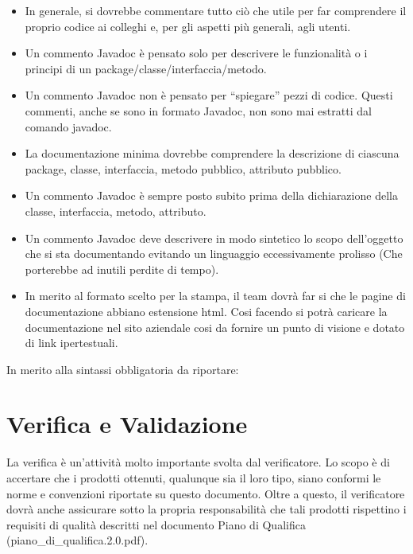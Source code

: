 {\begin{itemize}
	\item In generale, si dovrebbe commentare tutto ciò che utile per far comprendere il proprio codice ai colleghi e, per gli aspetti più generali, agli utenti.
	\item Un commento Javadoc è pensato solo per descrivere le funzionalità o i principi di un package/classe/interfaccia/metodo.
	\item Un commento Javadoc non è pensato per ``spiegare'' pezzi di codice. Questi commenti, anche se sono in formato Javadoc, non sono mai estratti dal comando javadoc.
	\item La documentazione minima dovrebbe comprendere la descrizione di ciascuna package, classe, interfaccia, metodo pubblico, attributo pubblico.
	\item Un commento Javadoc è sempre posto subito prima della dichiarazione della classe, interfaccia, metodo, attributo.
	\item Un commento Javadoc deve descrivere in modo sintetico lo scopo dell'oggetto che si sta documentando evitando un linguaggio eccessivamente prolisso (Che porterebbe ad inutili perdite di tempo).
	\item In merito al formato scelto per la stampa, il team dovrà far si che le pagine di documentazione abbiano estensione html. Cosi facendo si potrà caricare la documentazione nel sito aziendale cosi da fornire un punto di visione e dotato di link ipertestuali.
\end{itemize}

In merito alla sintassi obbligatoria da riportare:

\begin{description}
	\item 
\end{description}

\newpage
\section{Verifica e Validazione}
La verifica è un'attività molto importante svolta dal verificatore. Lo scopo è di accertare che i prodotti ottenuti, qualunque sia il loro tipo, siano conformi le norme e convenzioni riportate su questo documento. Oltre a questo, il verificatore dovrà anche assicurare sotto la propria responsabilità che tali prodotti rispettino i requisiti di qualità descritti nel documento Piano di Qualifica (piano\_di\_qualifica.2.0.pdf).

}

